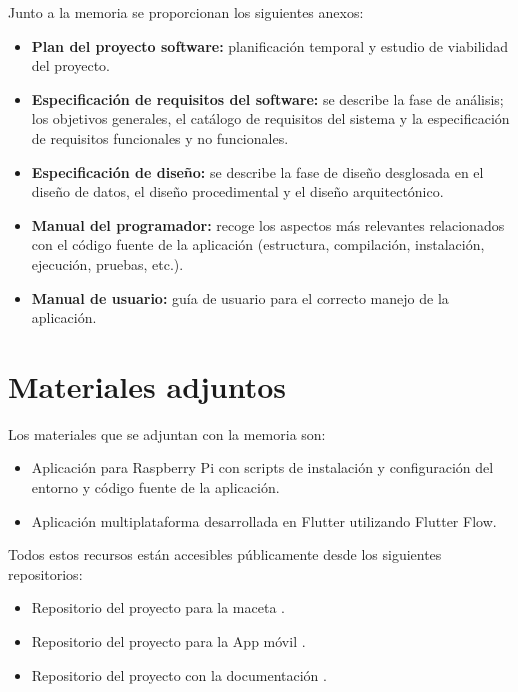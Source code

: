 Junto a la memoria se proporcionan los siguientes anexos:

\begin{itemize}
    \item \textbf{Plan del proyecto software:} planificación temporal y estudio de viabilidad del proyecto.
    \item \textbf{Especificación de requisitos del software:} se describe la fase de análisis; los objetivos generales, el catálogo de requisitos del sistema y la especificación de requisitos funcionales y no funcionales.
    \item \textbf{Especificación de diseño:} se describe la fase de diseño desglosada en el diseño de datos, el diseño procedimental y el diseño arquitectónico.
    \item \textbf{Manual del programador:} recoge los aspectos más relevantes relacionados con el código fuente de la aplicación (estructura, compilación, instalación, ejecución, pruebas, etc.).
    \item \textbf{Manual de usuario:} guía de usuario para el correcto manejo de la aplicación.
\end{itemize}

\section{Materiales adjuntos}\label{materiales-adjuntos}

Los materiales que se adjuntan con la memoria son: 
\begin{itemize}
    \item Aplicación para Raspberry Pi con scripts de instalación y configuración del entorno y código fuente de la aplicación.
    \item Aplicación multiplataforma desarrollada en Flutter utilizando Flutter Flow.
\end{itemize}

Todos estos recursos están accesibles públicamente desde los siguientes repositorios:
\begin{itemize}
    \item Repositorio del proyecto para la maceta \cite{GreenInHouse:repo:Maceta}.
    \item Repositorio del proyecto para la App móvil \cite{GreenInHouse:repo:AppMovil}.
    \item Repositorio del proyecto con la documentación \cite{GreenInHouse:repo:Documentación}.
\end{itemize}